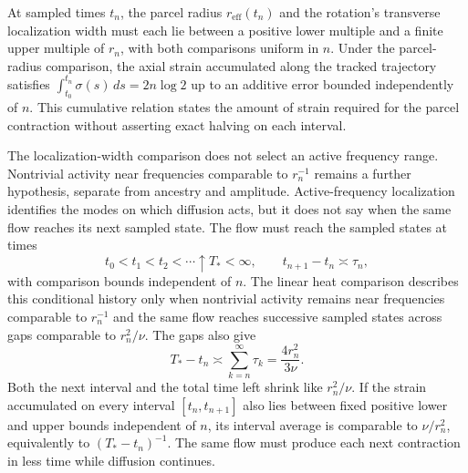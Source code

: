 At sampled times \(t_n\), the parcel radius \(r_{\mathrm{eff}}(t_n)\) and the rotation's transverse localization width must each lie between a positive lower multiple and a finite upper multiple of \(r_n\), with both comparisons uniform in \(n\). Under the parcel-radius comparison, the axial strain accumulated along the tracked trajectory satisfies \(\int_{t_0}^{t_n}\sigma(s)\,ds=2n\log 2\) up to an additive error bounded independently of \(n\). This cumulative relation states the amount of strain required for the parcel contraction without asserting exact halving on each interval.

The localization-width comparison does not select an active frequency range. Nontrivial activity near frequencies comparable to \(r_n^{-1}\) remains a further hypothesis, separate from ancestry and amplitude. Active-frequency localization identifies the modes on which diffusion acts, but it does not say when the same flow reaches its next sampled state. The flow must reach the sampled states at times
\[
  t_0<t_1<t_2<\cdots\uparrow T_*<\infty,
  \qquad
  t_{n+1}-t_n\asymp\tau_n,
\]
with comparison bounds independent of \(n\). The linear heat comparison describes this conditional history only when nontrivial activity remains near frequencies comparable to \(r_n^{-1}\) and the same flow reaches successive sampled states across gaps comparable to \(r_n^2/\nu\). The gaps also give
\[
  T_*-t_n
  \asymp
  \sum_{k=n}^{\infty}\tau_k
  =
  \frac{4r_n^2}{3\nu}.
\]
Both the next interval and the total time left shrink like \(r_n^2/\nu\). If the strain accumulated on every interval \([t_n,t_{n+1}]\) also lies between fixed positive lower and upper bounds independent of \(n\), its interval average is comparable to \(\nu/r_n^2\), equivalently to \((T_*-t_n)^{-1}\). The same flow must produce each next contraction in less time while diffusion continues.
